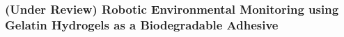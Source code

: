 \subsubsection{(Under Review) Robotic Environmental Monitoring using Gelatin Hydrogels as a Biodegradable Adhesive}


